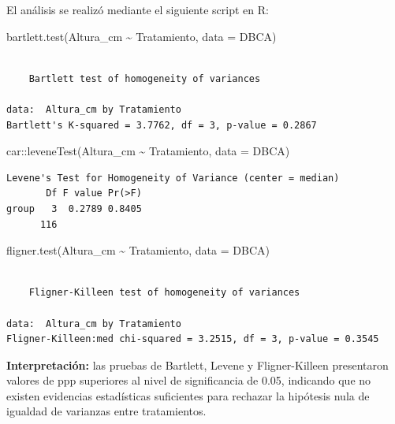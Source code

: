\documentclass[
  spanish,
  letterpaper,
  DIV=11,
  numbers=noendperiod]{scrreprt}
\newenvironment{Shaded}{\begin{snugshade}}{\end{snugshade}}
\newcommand{\AttributeTok}[1]{\textcolor[rgb]{0.40,0.45,0.13}{#1}}
\newcommand{\FunctionTok}[1]{\textcolor[rgb]{0.28,0.35,0.67}{#1}}
\newcommand{\NormalTok}[1]{\textcolor[rgb]{0.00,0.23,0.31}{#1}}
\newcommand{\SpecialCharTok}[1]{\textcolor[rgb]{0.37,0.37,0.37}{#1}}
\begin{document}
El análisis se realizó mediante el siguiente script en R:

\begin{Shaded}
\begin{Highlighting}[]
\FunctionTok{bartlett.test}\NormalTok{(Altura\_cm }\SpecialCharTok{\textasciitilde{}}\NormalTok{ Tratamiento, }\AttributeTok{data =}\NormalTok{ DBCA)}
\end{Highlighting}
\end{Shaded}

\begin{verbatim}

    Bartlett test of homogeneity of variances

data:  Altura_cm by Tratamiento
Bartlett's K-squared = 3.7762, df = 3, p-value = 0.2867
\end{verbatim}

\begin{Shaded}
\begin{Highlighting}[]
\NormalTok{car}\SpecialCharTok{::}\FunctionTok{leveneTest}\NormalTok{(Altura\_cm }\SpecialCharTok{\textasciitilde{}}\NormalTok{ Tratamiento, }\AttributeTok{data =}\NormalTok{ DBCA)}
\end{Highlighting}
\end{Shaded}

\begin{verbatim}
Levene's Test for Homogeneity of Variance (center = median)
       Df F value Pr(>F)
group   3  0.2789 0.8405
      116               
\end{verbatim}

\begin{Shaded}
\begin{Highlighting}[]
\FunctionTok{fligner.test}\NormalTok{(Altura\_cm }\SpecialCharTok{\textasciitilde{}}\NormalTok{ Tratamiento, }\AttributeTok{data =}\NormalTok{ DBCA)}
\end{Highlighting}
\end{Shaded}

\begin{verbatim}

    Fligner-Killeen test of homogeneity of variances

data:  Altura_cm by Tratamiento
Fligner-Killeen:med chi-squared = 3.2515, df = 3, p-value = 0.3545
\end{verbatim}

\textbf{Interpretación:} las pruebas de Bartlett, Levene y
Fligner-Killeen presentaron valores de ppp superiores al nivel de
significancia de 0.05, indicando que no existen evidencias estadísticas
suficientes para rechazar la hipótesis nula de igualdad de varianzas
entre tratamientos.
\end{document}
